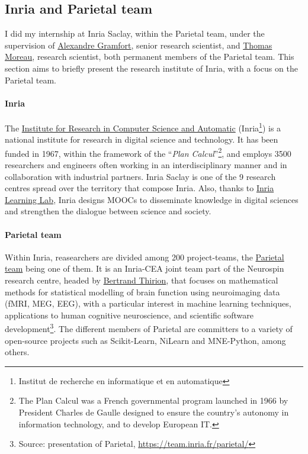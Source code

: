 \subsection{Inria and Parietal team}

I did my internship at Inria Saclay, within the Parietal team, under the supervision of \href{http://alexandre.gramfort.net}{Alexandre Gramfort}, senior research scientist, and \href{https://tommoral.github.io/about.html}{Thomas Moreau}, research scientist, both permanent members of the Parietal team.
This section aims to briefly present the research institute of Inria, with a focus on the Parietal team.

\paragraph{Inria} The \href{https://www.inria.fr/fr}{Institute for Research in Computer Science and Automatic} (Inria\footnote{Institut de recherche en informatique et en automatique}) is a national institute for research in digital science and technology.
It has been funded in 1967, within the framework of the ``\textit{Plan Calcul}''\footnote{The Plan Calcul was a French governmental program launched in 1966 by President Charles de Gaulle designed to ensure the country's autonomy in information technology, and to develop European IT.}, and employs \num{3500} researchers and engineers often working in an interdisciplinary manner and in collaboration with industrial partners.
Inria Saclay is one of the 9 research centres spread over the territory that compose Inria.
 Also, thanks to \href{https://learninglab.inria.fr}{Inria Learning Lab}, Inria designs MOOCs to disseminate knowledge in digital sciences and strengthen the dialogue between science and society.


\paragraph{Parietal team} Within Inria, reasearchers are divided among \num{200} project-teams, the \href{https://team.inria.fr/parietal/}{Parietal team} being one of them.
It is an Inria-CEA joint team part of the Neurospin research centre, headed by \href{https://pages.saclay.inria.fr/bertrand.thirion/}{Bertrand Thirion}, that focuses on mathematical methods for statistical modelling of brain function using neuroimaging data (fMRI, MEG, EEG), with a particular interest in machine learning techniques, applications to human cognitive neuroscience, and scientific software development\footnote{Source: presentation of Parietal, \url{https://team.inria.fr/parietal/}}.
The different members of Parietal are committers to a variety of open-source projects such as Scikit-Learn, 
NiLearn and MNE-Python, among others.
